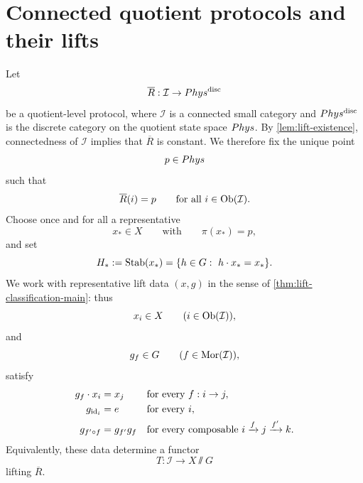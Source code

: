 \section{Connected quotient protocols and their lifts}
Let
\[
	\overline R:\mathcal I\to Phys^{\mathrm{disc}}
\]
be a quotient-level protocol, where \(\mathcal I\) is a connected small
category and \(Phys^{\mathrm{disc}}\) is the discrete category on the quotient
state space \(Phys\).
By \cref{lem:lift-existence}, connectedness of \(\mathcal I\) implies
that \(\overline R\) is constant. We therefore fix the unique point
\[
	p\in Phys
\]
such that
\[
	\overline R(i)=p
	\qquad
	\text{for all }i\in \operatorname{Ob}(\mathcal I).
\]
Choose once and for all a representative
\[
	x_*\in X
	\qquad
	\text{with}\qquad
	\pi(x_*)=p,
\]
and set
\[
	H_*:=\operatorname{Stab}(x_*)
	=
	\{h\in G:\ h\cdot x_*=x_*\}.
\]
We work with representative lift data \((x,g)\) in the sense of
\cref{thm:lift-classification-main}: thus
\[
	x_i\in X
	\qquad (i\in \operatorname{Ob}(\mathcal I)),
\]
and
\[
	g_f\in G
	\qquad (f\in \mathrm{Mor}(\mathcal I)),
\]
satisfy
\begin{align}
	g_f\cdot x_i  & = x_j
	              &             & \text{for every }f:i\to j, \label{eq:DO-T1}                     \\
	g_{\operatorname{id}_i}     & = e
	              &             & \text{for every }i, \label{eq:DO-T2}                            \\
	g_{f'\circ f} & = g_{f'}g_f
	              &             & \text{for every composable }i\xrightarrow{f}j\xrightarrow{f'}k.
	\label{eq:DO-T3}
\end{align}
Equivalently, these data determine a functor
\[
	T:\mathcal I\to X\sslash G
\]
lifting \(\overline R\).
